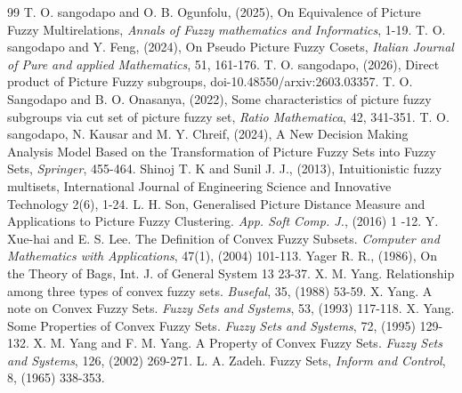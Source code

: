 \documentclass[12pt,letterpaper]{amsart}
\theoremstyle{plain}
\theoremstyle{definition}
\numberwithin{equation}{section}
\begin{document}
\begin{thebibliography}{99}
 T. O. sangodapo and O. B. Ogunfolu, (2025), On Equivalence of Picture Fuzzy Multirelations, \emph{Annals of Fuzzy mathematics and Informatics}, 1-19.
 T. O. sangodapo and Y. Feng, (2024), On Pseudo Picture Fuzzy Cosets, \emph{Italian Journal of Pure and applied Mathematics}, 51, 161-176.
 T. O. sangodapo, (2026), Direct product of Picture Fuzzy subgroups, doi-10.48550/arxiv:2603.03357.
 T. O. Sangodapo and B. O. Onasanya, (2022), Some characteristics of picture fuzzy subgroups via cut set of picture fuzzy set, \emph{Ratio Mathematica}, 42, 341-351.
  T. O. sangodapo, N. Kausar and M. Y. Chreif, (2024), A New Decision Making Analysis Model Based on the Transformation of Picture Fuzzy Sets into Fuzzy Sets, \emph{Springer}, 455-464.
 Shinoj T. K and Sunil J. J., (2013), Intuitionistic fuzzy multisets, International Journal of Engineering Science and Innovative
Technology 2(6), 1-24.
 L. H. Son, Generalised Picture Distance Measure and Applications to Picture Fuzzy Clustering.  \emph{App. Soft Comp. J.}, (2016) 1 -12.
 Y. Xue-hai and E. S. Lee. The Definition of Convex Fuzzy Subsets. \emph{Computer and Mathematics with Applications}, 47(1), (2004) 101-113.
 Yager R. R., (1986), On the Theory of Bags, Int. J. of General System 13 23-37.
 X. M. Yang. Relationship among three types of convex fuzzy sets. \emph{Busefal}, 35, (1988) 53-59.
 X. Yang. A note on Convex Fuzzy Sets. \emph{Fuzzy Sets and Systems}, 53, (1993) 117-118.
 X. Yang. Some Properties of Convex Fuzzy Sets. \emph{Fuzzy Sets and Systems}, 72, (1995) 129-132.
 X. M. Yang and F. M. Yang. A Property of Convex Fuzzy Sets. \emph{Fuzzy Sets and Systems}, 126, (2002) 269-271.
 L. A. Zadeh. Fuzzy Sets, \emph {Inform and Control}, 8, (1965) 338-353.
\end{thebibliography}
\end{document}
